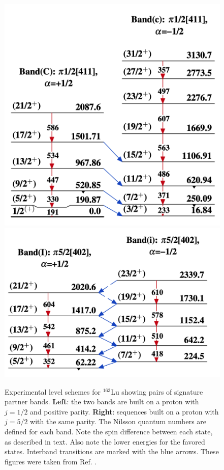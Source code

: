 \begin{figure}
    \centering
    \includegraphics[scale=0.45]{Chapters/Figures/Lu_163_K12-band.png}
    \includegraphics[scale=0.28]{Chapters/Figures/Lu_163_signatureSplitting.png}
    \caption{Experimental level schemes for $^{163}$Lu showing pairs of signature partner bands. \textbf{Left}: the two bands are built on a proton with $j=1/2$ and positive parity. \textbf{Right}: sequences built on a proton with $j=5/2$ with the same parity. The Nilsson quantum numbers are defined for each band. Note the spin difference between each state, as described in text. Also note the lower energies for the favored states. Interband transitions are marked with the blue arrows. These figures were taken from Ref. \cite{reich2010nuclear}.}
    \label{level-scheme-signature-splitting}
\end{figure}

